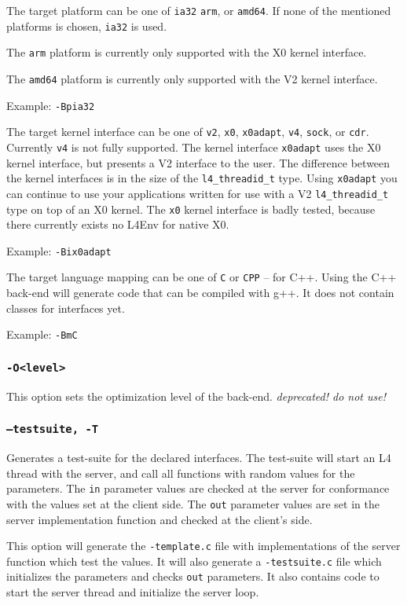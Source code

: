 The target platform can be one of {\tt ia32} {\tt arm}, or {\tt amd64}.  If
none of the mentioned platforms is chosen, {\tt ia32} is used.

The {\tt arm} platform is currently only supported with the X0 kernel
interface.

The {\tt amd64} platform is currently only supported with the V2 kernel
interface.

Example: \verb|-Bpia32|

The target kernel interface can be one of {\tt v2}, {\tt x0}, {\tt x0adapt},
{\tt v4}, {\tt sock}, or {\tt cdr}. Currently {\tt v4} is not fully supported.
The kernel interface {\tt x0adapt} uses the X0 kernel interface, but presents
a V2 interface to the user. The difference between the kernel interfaces is in
the size of the \verb|l4_threadid_t| type. Using {\tt x0adapt} you can
continue to use your applications written for use with a V2
\verb|l4_threadid_t| type on top of an X0 kernel.  The {\tt x0} kernel
interface is badly tested, because there currently exists no L4Env for native
X0.

Example: \verb|-Bix0adapt|

The target language mapping can be one of {\tt C} or {\tt CPP} -- for C++.
Using the C++ back-end will generate code that can be compiled with g++. It
does not contain classes for interfaces yet.

Example: \verb|-BmC|

\subsubsection{{\tt -O<level>}}
This option sets the optimization level of the back-end.
\emph{deprecated! do not use!}

\subsubsection{{\tt --testsuite, -T}}
Generates a test-suite for the declared interfaces. The test-suite
will start an L4 thread with the server, and call all functions
with random values for the parameters. The \verb|in| parameter
values are checked at the server for conformance with the values
set at the client side. The \verb|out| parameter values are set
in the server implementation function and checked at the client's
side.

This option will generate the \verb|-template.c| file with 
implementations of the server function which test the values.
It will also generate a \verb|-testsuite.c| file which initializes
the parameters and checks \verb|out| parameters. It also contains
code to start the server thread and initialize the server loop.

